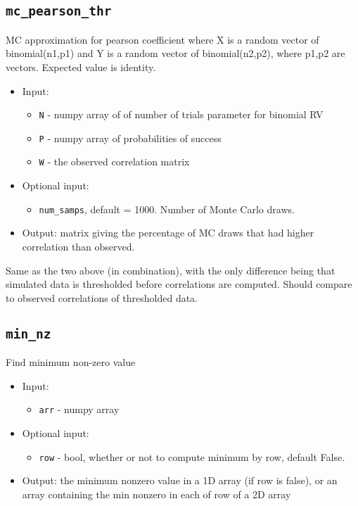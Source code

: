 \documentclass[10pt]{article}
\theoremstyle{definition}
\numberwithin{theorem}{section}
\numberwithin{definition}{section}
\numberwithin{lemma}{section}
\numberwithin{corollary}{section}
\numberwithin{clm}{section}
\numberwithin{rmk}{section}
\begin{document}
\cprotect \subsection{\verb|mc_pearson_thr|}
MC approximation for pearson coefficient where X is a random vector of binomial(n1,p1)
and Y is a random vector of binomial(n2,p2), where p1,p2 are vectors. Expected value is identity.
\begin{itemize}
	\item Input:
		\begin{itemize}
		\item \verb|N| - numpy array of of number of trials parameter for binomial RV
		\item  \verb|P| - numpy array of probabilities of success
		\item \verb|W| - the observed correlation matrix
	\end{itemize}
	\item Optional input: 
		\begin{itemize}
		\item \verb|num_samps|, default = 1000. Number of Monte Carlo draws.
	\end{itemize}
	\item Output: matrix giving the percentage of MC draws that had higher correlation than observed.
\end{itemize}

Same as the two above (in combination), with the only difference being that simulated data is thresholded before correlations are computed. Should compare to observed correlations of thresholded data. 

\cprotect \subsection{\verb|min_nz|}
Find minimum non-zero value
\begin{itemize}
	\item Input: 
	\begin{itemize}
		\item  \verb|arr| - numpy array
	\end{itemize}
	\item Optional input: 
	\begin{itemize}
		\item \verb|row| - bool, whether or not to compute minimum by row, default False.
	\end{itemize}
	\item Output: the minimum nonzero value in a 1D array (if row is false), or an array containing the min nonzero in each of row of a 2D array
\end{itemize}
\end{document}

